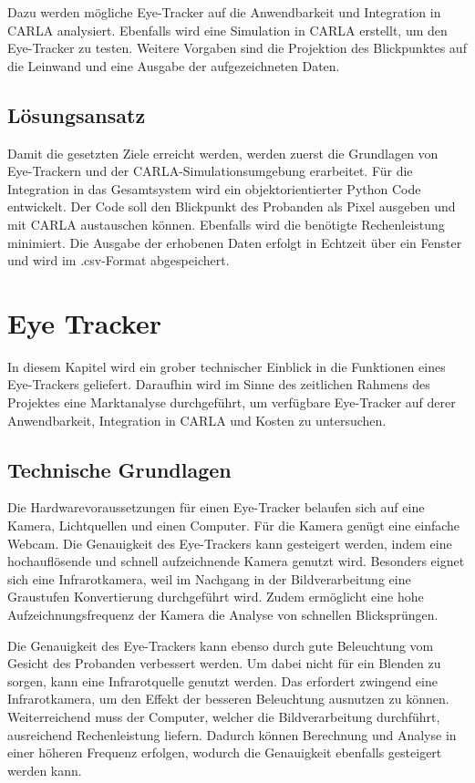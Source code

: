 Dazu werden mögliche Eye-Tracker auf die Anwendbarkeit und Integration in CARLA analysiert. Ebenfalls wird eine Simulation in CARLA erstellt, um den Eye-Tracker zu testen. Weitere Vorgaben sind die Projektion des Blickpunktes auf die Leinwand und eine Ausgabe der aufgezeichneten Daten.

\subsection{Lösungsansatz}

Damit die gesetzten Ziele erreicht werden, werden zuerst die Grundlagen von Eye-Trackern und der CARLA-Simulationsumgebung erarbeitet. Für die Integration in das Gesamtsystem wird ein objektorientierter Python Code entwickelt. Der Code soll den Blickpunkt des Probanden als Pixel ausgeben und mit CARLA austauschen können. Ebenfalls wird die benötigte Rechenleistung minimiert. Die Ausgabe der erhobenen Daten erfolgt in Echtzeit über ein Fenster und wird im .csv-Format abgespeichert.

\section{Eye Tracker}

In diesem Kapitel wird ein grober technischer Einblick in die Funktionen eines Eye-Trackers geliefert. Daraufhin wird im Sinne des zeitlichen Rahmens des Projektes eine Marktanalyse durchgeführt, um verfügbare Eye-Tracker auf derer Anwendbarkeit, Integration in CARLA und Kosten zu untersuchen.

\subsection{Technische Grundlagen}

Die Hardwarevoraussetzungen für einen Eye-Tracker belaufen sich auf eine Kamera, Lichtquellen und einen Computer. Für die Kamera genügt eine einfache Webcam. Die Genauigkeit des Eye-Trackers kann gesteigert werden, indem eine hochauflösende und schnell aufzeichnende Kamera genutzt wird. Besonders eignet sich eine Infrarotkamera, weil im Nachgang in der Bildverarbeitung eine Graustufen Konvertierung durchgeführt wird. Zudem ermöglicht eine hohe Aufzeichnungsfrequenz der Kamera die Analyse von schnellen Blicksprüngen.

Die Genauigkeit des Eye-Trackers kann ebenso durch gute Beleuchtung vom Gesicht des Probanden verbessert werden. Um dabei nicht für ein Blenden zu sorgen, kann eine Infrarotquelle genutzt werden. Das erfordert zwingend eine Infrarotkamera, um den Effekt der besseren Beleuchtung ausnutzen zu können. Weiterreichend muss der Computer, welcher die Bildverarbeitung durchführt, ausreichend Rechenleistung liefern. Dadurch können Berechnung und Analyse in einer höheren Frequenz erfolgen, wodurch die Genauigkeit ebenfalls gesteigert werden kann.

